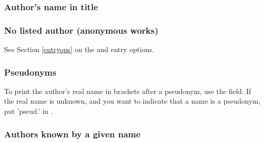 \documentclass[11pt,letterpaper,oneside]{article}
\begin{document}
\begin{citebib}
\item \cite[14]{kendris2010}
\item \cite[27--28]{kendris2010}
\end{citebib}

\subsubsection{Author's name in title}
\label{14.78}

\begin{citebib}
\item \cite*[233]{franklin1868}
\item \cite*[234]{franklin1868}
\end{citebib}

\subsubsection{No listed author (anonymous works)}
\label{14.79}

See Section \ref{entryops} on the  and 
entry options.

\begin{citebib}
\item \cite{anon1610}
\item \cite{anon1547}
\item \cite{horsley1796}
\item \cite{hawkes1834}
\end{citebib}

\subsubsection{Pseudonyms}

To print the author's real name in brackets after a pseudonym, use the
 field. If the real name is unknown, and you want
to indicate that a name is a pseudonym, put 'pseud.' in
.

\begin{citebib}
\item \cite{carre1982}
\item \cite{stendhal1925}
\end{citebib}

\setcounter{subsubsection}{82}
\subsubsection{Authors known by a given name}
\end{document}
